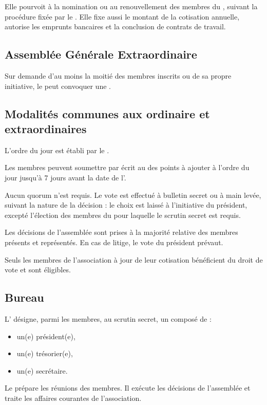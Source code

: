\documentclass[a4paper,french,10pt]{article}
\newcommand{\article}[1]{\subsection{#1}\addtocounter{article}{1}}
\newcounter{article}
\begin{document}
Elle pourvoit à la nomination ou au renouvellement des membres du \bureau{}, suivant la procédure fixée par le \RI{}. Elle fixe aussi le montant de la cotisation annuelle, autorise les emprunts bancaires et la conclusion de contrats de travail.


\article{Assemblée Générale Extraordinaire}
\label{sec:age}

Sur demande d'au moins la moitié des membres inscrits ou de sa propre initiative, le \bureau{} peut convoquer une \AGE{}.

\article{Modalités communes aux \AG{} ordinaire et extraordinaires}
\label{sec:ag}
L'ordre du jour est établi par le \bureau{}. %

Les membres peuvent soumettre par écrit au \bureau{} des points à ajouter à l'ordre du jour jusqu'à 7 jours avant la date de l'\AG{}.


Aucun quorum n'est requis. Le vote est effectué à bulletin secret ou à
main levée, suivant la nature de la décision : le choix est laissé à
l'initiative du président, excepté l'élection des membres du \bureau{}
pour laquelle le scrutin secret est requis.

Les décisions de l’assemblée sont prises à la majorité relative des
membres présents et représentés. En cas de litige, le vote du
président prévaut.

Seuls les membres de l’association à jour de leur cotisation
bénéficient du droit de vote et sont éligibles.





\article{Bureau}
\label{sec:bureau}
L’\AG{} désigne, parmi les membres, au scrutin secret, un
\bureau{} composé de :
\begin{itemize}
\item un(e) président(e),
  
\item un(e) trésorier(e),

\item un(e) secrétaire.
\end{itemize}

Le \bureau{} prépare les réunions des membres. Il exécute les décisions de l’assemblée et traite les affaires courantes de l’association.
\end{document}
